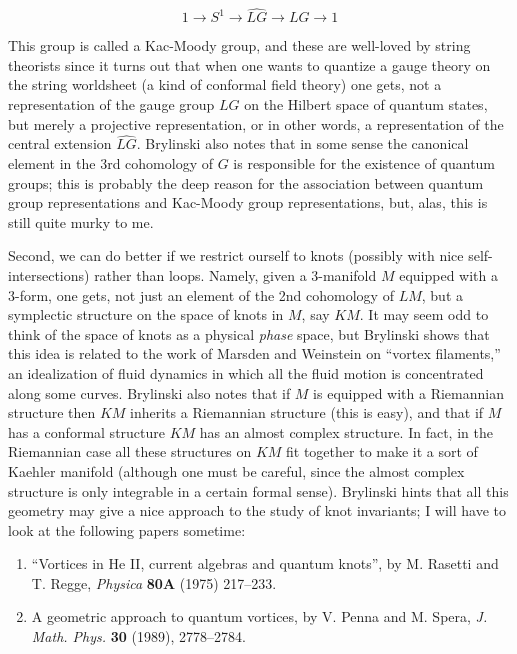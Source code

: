 \documentclass{article}
\begin{document}
\[1 \to S^1 \to \widehat{LG} \to LG \to 1\]

This group is called a Kac-Moody group, and these are well-loved by
string theorists since it turns out that when one wants to quantize a
gauge theory on the string worldsheet (a kind of conformal field theory)
one gets, not a representation of the gauge group \(LG\) on the Hilbert
space of quantum states, but merely a projective representation, or in
other words, a representation of the central extension \(\widehat{LG}\).
Brylinski also notes that in some sense the canonical element in the 3rd
cohomology of \(G\) is responsible for the existence of quantum groups;
this is probably the deep reason for the association between quantum
group representations and Kac-Moody group representations, but, alas,
this is still quite murky to me.

Second, we can do better if we restrict ourself to knots (possibly with
nice self-intersections) rather than loops. Namely, given a 3-manifold
\(M\) equipped with a 3-form, one gets, not just an element of the 2nd
cohomology of \(LM\), but a symplectic structure on the space of knots
in \(M\), say \(KM\). It may seem odd to think of the space of knots as
a physical \emph{phase} space, but Brylinski shows that this idea is
related to the work of Marsden and Weinstein on ``vortex filaments,'' an
idealization of fluid dynamics in which all the fluid motion is
concentrated along some curves. Brylinski also notes that if \(M\) is
equipped with a Riemannian structure then \(KM\) inherits a Riemannian
structure (this is easy), and that if \(M\) has a conformal structure
\(KM\) has an almost complex structure. In fact, in the Riemannian case
all these structures on \(KM\) fit together to make it a sort of Kaehler
manifold (although one must be careful, since the almost complex
structure is only integrable in a certain formal sense). Brylinski hints
that all this geometry may give a nice approach to the study of knot
invariants; I will have to look at the following papers sometime:

\begin{enumerate}
\def\labelenumi{\arabic{enumi})}
\setcounter{enumi}{2}
\item
  ``Vortices in He II, current algebras and quantum knots'', by M.
  Rasetti and T. Regge, \emph{Physica} \textbf{80A} (1975) 217--233.
\item
  A geometric approach to quantum vortices, by V. Penna and M. Spera,
  \emph{J. Math. Phys.} \textbf{30} (1989), 2778--2784.
\end{enumerate}
\end{document}
